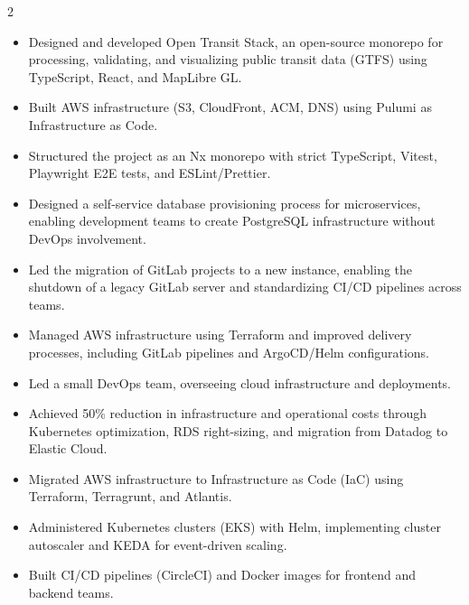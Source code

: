 \documentclass[10pt,a4paper,ragged2e,withhyper]{altacv}
\begin{document}

\makecvheader

\begin{paracol}{2}



\begin{itemize}
\item Designed and developed Open Transit Stack, an open-source monorepo for processing, validating, and visualizing public transit data (GTFS) using TypeScript, React, and MapLibre GL.
\item Built AWS infrastructure (S3, CloudFront, ACM, DNS) using Pulumi as Infrastructure as Code.
\item Structured the project as an Nx monorepo with strict TypeScript, Vitest, Playwright E2E tests, and ESLint/Prettier.
\end{itemize}

\divider

\begin{itemize}
\item Designed a self-service database provisioning process for microservices, enabling development teams to create PostgreSQL infrastructure without DevOps involvement.
\item Led the migration of GitLab projects to a new instance, enabling the shutdown of a legacy GitLab server and standardizing CI/CD pipelines across teams.
\item Managed AWS infrastructure using Terraform and improved delivery processes, including GitLab pipelines and ArgoCD/Helm configurations.
\end{itemize}

\divider

\begin{itemize}
\item Led a small DevOps team, overseeing cloud infrastructure and deployments.
\item Achieved 50\% reduction in infrastructure and operational costs through Kubernetes optimization, RDS right-sizing, and migration from Datadog to Elastic Cloud.
\item Migrated AWS infrastructure to Infrastructure as Code (IaC) using Terraform, Terragrunt, and Atlantis.
\item Administered Kubernetes clusters (EKS) with Helm, implementing cluster autoscaler and KEDA for event-driven scaling.
\item Built CI/CD pipelines (CircleCI) and Docker images for frontend and backend teams.
\end{itemize}


\end{paracol}
\end{document}
